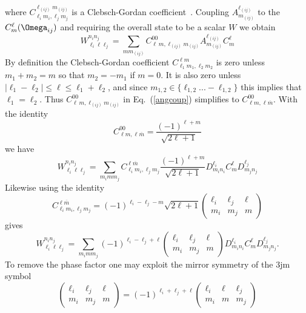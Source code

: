 \documentclass[preprint]{iucr}              %
\newcommand{\mb}[1]{\ensuremath{\mbox{\boldmath $ #1 $}}}
\begin{document}
where $C_{\ell_{i}m_{i},\ell_{j}m_j}^{\ell_{(ij)}m_{(ij)}}$ is a
Clebsch-Gordan coefficient~\cite{Varshalovich88}.  Coupling
$A^{\ell_{(ij)}}_{m_{(ij)}}$ to the $C^\ell_m(\mb{\Omega}_{ij})$
and requiring the overall state to be a scalar $W$ we obtain
\begin{equation}
\label{angcoup}W^{n_i n_j}_{\ell_i \ell
\ell_j}=\sum_{mm_{(ij)}}C_{\ell\,m,\ell_{(ij)}m_{(ij)}}^{0
0}A^{\ell_{(ij)}}_{m_{(ij)}}C^\ell_m
\end{equation}
By definition the Clebsch-Gordan coefficient
$C_{\ell_1m_1,\ell_2m_2}^{\ell m}$ is zero unless $m_1+m_2=m$ so
that $m_2=-m_1$ if $m=0$. It is also zero unless
$|\ell_1-\ell_2|\leq \ell\leq \ell_1+\ell_2$, and since
$m_{1,2}\in\{\ell_{1,2}...-\ell_{1,2}\}$ this implies that
$\ell_1=\ell_2$. Thus $C_{\ell\,m,\ell_{(ij)}m_{(ij)}}^{0 0}$ in
Eq.~(\ref{angcoup}) simplifies to $C_{\ell m,\ell
\overline{m}}^{00}$. With the identity~\cite{Varshalovich88}
\begin{equation}
\label{coupid}C_{\ell m,\ell
\overline{m}}^{00}=\frac{(-1)^{\ell+m}}{\sqrt{2\ell+1}}
\end{equation}
we have
\begin{equation}
\label{inv}W^{n_i n_j}_{\ell_i \ell
\ell_j}=\sum_{m_imm_j}C_{\ell_i
m_i,\ell_jm_j}^{\ell\overline{m}}\frac{(-1)^{\ell+m}}{\sqrt{2\ell+1}}D^{\ell_i}_
{m_in_i}C^\ell_mD^{\ell_j}_{m_jn_j}
\end{equation}
Likewise using the identity~\cite{Varshalovich88}
\begin{equation}
\label{id}C^{\ell\overline{m}}_{\ell_im_i,\ell_jm_j}=(-1)^{\ell_i-\ell_j-m}\sqrt
{2\ell+1}\left(\begin{array}{ccc}
\ell_i & \ell_j & \ell \\ m_i & m_j & m \end{array}\right)
\end{equation}
gives
\begin{equation}
W^{n_i n_j}_{\ell_i \ell
\ell_j}=\sum_{m_imm_j}(-1)^{\ell_i-\ell_j+\ell}\left(\begin{array}{ccc}
\ell_i & \ell_j & \ell \\ m_i & m_j & m
\end{array}\right)D^{\ell_i}_{m_in_i}C^\ell_mD^{\ell_j}_{m_jn_j}.
\end{equation}
To remove the phase factor one may exploit the mirror symmetry of
the 3jm symbol
\begin{equation}
\left(\begin{array}{ccc} \ell_i & \ell_j & \ell \\ m_i & m_j & m
\end{array}\right)=(-1)^{\ell_i+\ell_j+\ell}\left(\begin{array}{ccc} \ell_i &
\ell & \ell_j \\ m_i & m & m_j
\end{array}\right)
\end{equation}
\end{document}
